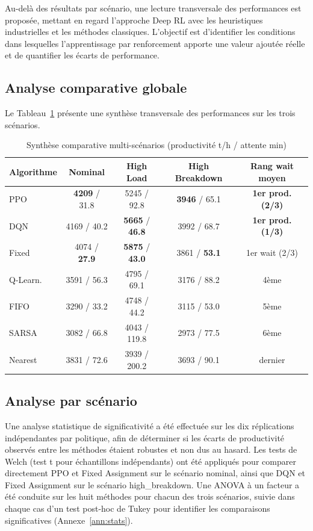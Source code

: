 \documentclass[11pt,a4paper]{report}
\begin{document}
Au-delà des résultats par scénario, une lecture transversale des performances est proposée, mettant en regard l'approche Deep RL avec les heuristiques industrielles et les méthodes classiques. L'objectif est d'identifier les conditions dans lesquelles l'apprentissage par renforcement apporte une valeur ajoutée réelle et de quantifier les écarts de performance.

\subsection{Analyse comparative globale}

Le Tableau~\ref{tab:synthese-comparative} présente une synthèse transversale des performances sur les trois scénarios.

\begin{table}[H]
\centering
\caption{Synthèse comparative multi-scénarios (productivité t/h / attente min)}
\label{tab:synthese-comparative}
\begin{tabular}{lcccc}
\toprule
\textbf{Algorithme} & \textbf{Nominal} & \textbf{High Load} & \textbf{High Breakdown} & \textbf{Rang wait moyen} \\
\midrule
PPO      & \textbf{4209} / 31.8 & 5245 / 92.8
         & \textbf{3946} / 65.1 & \textbf{1er prod. (2/3)} \\
DQN      & 4169 / 40.2 & \textbf{5665} / \textbf{46.8}
         & 3992 / 68.7 & \textbf{1er prod. (1/3)} \\
Fixed    & 4074 / \textbf{27.9} & \textbf{5875} / \textbf{43.0}
         & 3861 / \textbf{53.1} & 1er wait (2/3) \\
Q-Learn. & 3591 / 56.3 & 4795 / 69.1 & 3176 / 88.2 & 4ème \\
FIFO     & 3290 / 33.2 & 4748 / 44.2 & 3115 / 53.0 & 5ème \\
SARSA    & 3082 / 66.8 & 4043 / 119.8& 2973 / 77.5 & 6ème \\
Nearest  & 3831 / 72.6 & 3939 / 200.2& 3693 / 90.1 & dernier \\
\bottomrule
\end{tabular}
\end{table}

\subsection{Analyse par scénario}

Une analyse statistique de significativité a été effectuée sur les dix réplications indépendantes par politique, afin de déterminer si les écarts de productivité observés entre les méthodes étaient robustes et non dus au hasard. Les tests de Welch (test t pour échantillons indépendants) ont été appliqués pour comparer directement PPO et Fixed Assignment sur le scénario nominal, ainsi que DQN et Fixed Assignment sur le scénario high\_breakdown. Une ANOVA à un facteur a été conduite sur les huit méthodes pour chacun des trois scénarios, suivie dans chaque cas d'un test post-hoc de Tukey pour identifier les comparaisons significatives (Annexe~\ref{ann:stats}).
\end{document}
